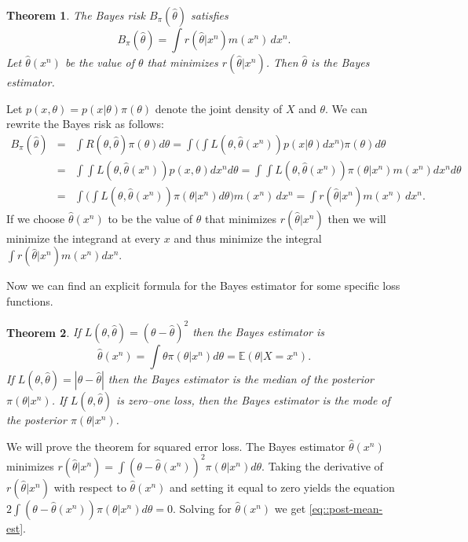 \documentclass[twoside,12pt]{article}
\newcounter{lecnum}
\newtheorem{theorem}{Theorem}[lecnum]
\newcommand\E{\mathbb{E}}
\begin{document}
\begin{theorem}
The Bayes risk $B_\pi(\widehat\theta)$ satisfies
\begin{equation}
B_\pi(\widehat\theta) = \int r(\widehat\theta|x^n) m(x^n) \,dx^n.
\end{equation}
Let $\widehat\theta(x^n)$ be the value of $\theta$ that minimizes
$r(\widehat\theta |x^n)$.
Then
$\widehat\theta$ is the Bayes estimator.
\end{theorem}

\proof
Let $p(x,\theta) = p(x|\theta)\pi(\theta)$ denote the joint density
of $X$ and $\theta$.
We can rewrite the Bayes risk as follows:
\begin{eqnarray*}
B_\pi(\widehat\theta) &=&
\int R(\theta,\widehat\theta) \pi(\theta) d\theta=
\int \Biggl(\int L(\theta,\widehat\theta(x^n)) p(x|\theta)dx^n \Biggr)\pi(\theta) d\theta\\
&=& \int \int L(\theta,\widehat\theta(x^n)) p(x,\theta) dx^n d\theta=
\int \int L(\theta,\widehat\theta(x^n)) \pi(\theta|x^n)m(x^n) dx^n d\theta\\
&=&\int \Biggl(\int L(\theta,\widehat\theta(x^n)) \pi(\theta|x^n)d\theta \Biggr)m(x^n)\,  dx^n=
\int r(\widehat\theta |x^n) m(x^n)\,dx^n.
\end{eqnarray*}
If we 
choose $\widehat\theta(x^n)$ to be the value of $\theta$
that minimizes $r(\widehat\theta|x^n)$
then we will
minimize the integrand at
every $x$ and thus minimize the integral
$\int r(\widehat\theta|x^n) m(x^n) dx^n$.


Now we can find an explicit formula for
the Bayes estimator for some specific loss functions.

\begin{theorem}
If $L(\theta,\widehat\theta)=(\theta - \widehat\theta)^2$
then the Bayes estimator is
\begin{equation}\label{eq::post-mean-est}
\widehat\theta(x^n) = \int \theta \pi(\theta|x^n) d\theta = \E(\theta|X=x^n).
\end{equation}
If $L(\theta,\widehat\theta)=|\theta - \widehat\theta|$
then the Bayes estimator is
the median of
the posterior $\pi(\theta|x^n)$.
If $L(\theta,\widehat\theta)$ is zero--one loss,
then the Bayes estimator is
the mode of
the posterior $\pi(\theta|x^n)$.
\end{theorem}

\proof
We will prove the theorem for squared error loss.
The Bayes estimator $\widehat\theta(x^n)$ minimizes
$r(\widehat\theta|x^n)=\int (\theta-\widehat\theta(x^n))^2 \pi(\theta|x^n)  d\theta$.
Taking the derivative of $r(\widehat\theta|x^n)$ with respect to $\widehat\theta(x^n)$
and setting it equal to zero yields
the equation
$2 \int (\theta -\widehat\theta(x^n)) \pi(\theta|x^n) d\theta =0$.
Solving for $\widehat\theta(x^n)$ 
we get \ref{eq::post-mean-est}. 
\end{document}
